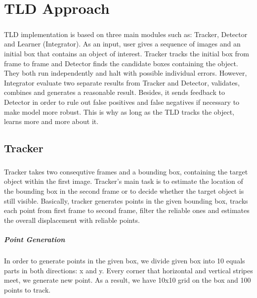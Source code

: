 \documentclass{report}
\begin{document}

    \chapter{TLD Approach}
    \paragraph{}
        TLD implementation is based on three main modules such as: Tracker, Detector and Learner (Integrator).
        As an input, user gives a sequence of images and an initial box that contains an object of interest.
        Tracker tracks the initial box from frame to frame and Detector finds the candidate boxes containing the object. They both
        run independently and halt with possible individual errors. However, Integrator
        evaluate two separate results from Tracker and Detector, validates, combines and generates a reasonable result.
        Besides, it sends feedback to Detector in order to rule out false positives and false negatives if necessary to make model
        more robust. This is why as long as the TLD tracks the object, learns more and more about it.
    \section{Tracker}
        \paragraph{}
            Tracker takes two consequtive frames and a bounding box, containing the target object within the first image.
            Tracker's main task is to estimate the location of the bounding box in the second frame or to decide whether the
            target object is still visible. Basically, tracker generates points in the given bounding box,
            tracks each point from first frame to second frame, filter the reliable ones and estimates
            the overall displacement with reliable points.
        \paragraph{Point Generation}
            In order to generate points in the given box, we divide given box into 10 equals
            parts in both directions: x and y. Every corner that horizontal and vertical stripes meet, we generate
            new point. As a result, we have 10x10 grid on the box and 100 points to track.
\end{document}
